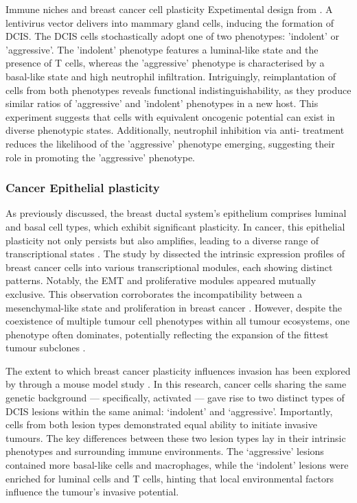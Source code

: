     {Immune niches and breast cancer cell plasticity}
    {Expetimental design from \textcite{Sinha2021-mf}. A lentivirus vector delivers  into mammary gland cells, inducing the formation of \acf{DCIS}. The \ac{DCIS} cells stochastically adopt one of two phenotypes: 'indolent' or 'aggressive'. The 'indolent' phenotype features a luminal-like state and the presence of T cells, whereas the 'aggressive' phenotype is characterised by a basal-like state and high neutrophil infiltration. Intriguingly, reimplantation of cells from both phenotypes reveals functional indistinguishability, as they produce similar ratios of 'aggressive' and 'indolent' phenotypes in a new host. This experiment suggests that cells with equivalent oncogenic potential can exist in diverse phenotypic states. Additionally, neutrophil inhibition via anti- treatment reduces the likelihood of the 'aggressive' phenotype emerging, suggesting their role in promoting the 'aggressive' phenotype.}


\subsubsection*{Cancer Epithelial plasticity}

As previously discussed, the breast ductal system's epithelium comprises luminal and basal cell types, which exhibit significant plasticity. In cancer, this epithelial plasticity not only persists but also amplifies, leading to a diverse range of transcriptional states \parencite{Wagner2019-zp, Wu2021-uq, Pal2021-rf}. The study by \textcite{Wu2021-uq} dissected the intrinsic expression profiles of breast cancer cells into various transcriptional modules, each showing distinct patterns. Notably, the \acf{EMT} and proliferative modules appeared mutually exclusive. This observation corroborates the incompatibility between a mesenchymal-like state and proliferation in breast cancer \parencite{Tsai2012-hb}. However, despite the coexistence of multiple tumour cell phenotypes within all tumour ecosystems, one phenotype often dominates, potentially reflecting the expansion of the fittest tumour subclones \parencite{Wagner2019-zp}.

The extent to which breast cancer plasticity influences invasion has been explored by \textcite{Sinha2021-mf} through a mouse model study . In this research, cancer cells sharing the same genetic background — specifically, activated  — gave rise to two distinct types of \ac{DCIS} lesions within the same animal: `indolent' and `aggressive'. Importantly, cells from both lesion types demonstrated equal ability to initiate invasive tumours. The key differences between these two lesion types lay in their intrinsic phenotypes and surrounding immune environments. The `aggressive' lesions contained more basal-like cells and macrophages, while the `indolent' lesions were enriched for luminal cells and T cells, hinting that local environmental factors influence the tumour's invasive potential.

